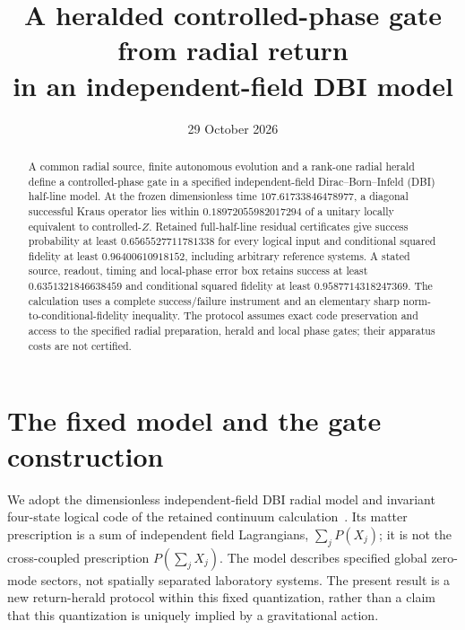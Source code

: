 \documentclass[11pt]{article}
\author{}
\date{29 October 2026}
\title{A heralded controlled-phase gate from radial return\\in an independent-field DBI model}
\begin{document}
\maketitle
\begin{abstract}
A common radial source, finite autonomous evolution and a rank-one radial herald define a controlled-phase gate in a specified independent-field Dirac--Born--Infeld (DBI) half-line model.
At the frozen dimensionless time $107.61733846478977$, a diagonal successful Kraus operator lies within $0.18972055982017294$ of a unitary locally equivalent to controlled-$Z$.
Retained full-half-line residual certificates give success probability at least $0.6565527711781338$ for every logical input and conditional squared fidelity at least $0.96400610918152$, including arbitrary reference systems.
A stated source, readout, timing and local-phase error box retains success at least $0.6351321846638459$ and conditional squared fidelity at least $0.9587714318247369$.
The calculation uses a complete success/failure instrument and an elementary sharp norm-to-conditional-fidelity inequality.
The protocol assumes exact code preservation and access to the specified radial preparation, herald and local phase gates; their apparatus costs are not certified.
\end{abstract}

\section{The fixed model and the gate construction}
We adopt the dimensionless independent-field DBI radial model and invariant four-state logical code of the retained continuum calculation~\cite{continuumproof,trialdata}.
Its matter prescription is a sum of independent field Lagrangians, $\sum_jP(X_j)$; it is not the cross-coupled prescription $P(\sum_jX_j)$.
The model describes specified global zero-mode sectors, not spatially separated laboratory systems.
The present result is a new return-herald protocol within this fixed quantization, rather than a claim that this quantization is uniquely implied by a gravitational action.
\end{document}
